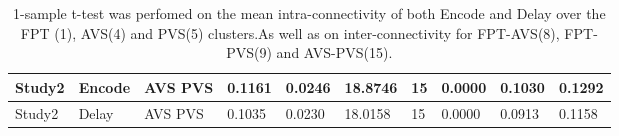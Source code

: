 \begin{table}[!hbt]
\begin{tabular}[0.2em]{@{}llllllllll@{}}
Study2 & Encode & AVS PVS & 0.1161 & 0.0246 & 18.8746 & 15 & 0.0000 & 0.1030 & 0.1292 \\\midrule
Study2 & Delay & AVS PVS & 0.1035 & 0.0230 & 18.0158 & 15 & 0.0000 & 0.0913 & 0.1158 \\\bottomrule[0.2em]
\end{tabular}
\caption{1-sample t-test was perfomed on the mean intra-connectivity of both Encode and Delay over the FPT (1), AVS(4) and PVS(5) clusters.As well as on inter-connectivity for FPT-AVS(8), FPT-PVS(9) and AVS-PVS(15).\label{tabel:GEMvsRestFC}}
\end{table}
